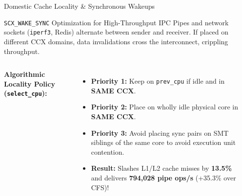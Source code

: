 \documentclass{beamer}
\begin{document}
\begin{frame}{Domestic Cache Locality \& Synchronous Wakeups}
  \begin{block}{\texttt{SCX\_WAKE\_SYNC} Optimization for High-Throughput IPC}
    \footnotesize
    Pipes and network sockets (\texttt{iperf3}, Redis) alternate between sender and receiver. If placed on different CCX domains, data invalidations cross the interconnect, crippling throughput.
  \end{block}

  \vspace{0.15cm}
  \begin{columns}[T]
      \textbf{Algorithmic Locality Policy (\texttt{select\_cpu}):}
      \begin{itemize}\itemsep2pt\tiny
        \item \textbf{Priority 1:} Keep on \texttt{prev\_cpu} if idle and in \textbf{SAME CCX}.
        \item \textbf{Priority 2:} Place on wholly idle physical core in \textbf{SAME CCX}.
        \item \textbf{Priority 3:} Avoid placing sync pairs on SMT siblings of the same core to avoid execution unit contention.
        \item \textbf{Result:} Slashes L1/L2 cache misses by \textbf{13.5\%} and delivers \textbf{794,028 pipe ops/s} (+35.3\% over CFS)!
      \end{itemize}

      \begin{center}
      \end{center}
  \end{columns}
\end{frame}
\end{document}
